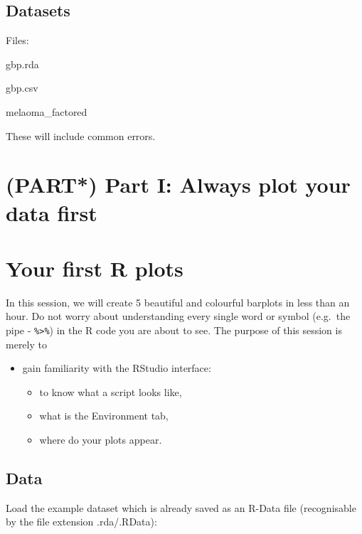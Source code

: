 \documentclass[]{book}
\makeatletter
\providecommand{\tightlist}{%
  \setlength{\itemsep}{0pt}\setlength{\parskip}{0pt}}
\newenvironment{kframe}{%
\medskip{}
\setlength{\fboxsep}{.8em}
 \def\at@end@of@kframe{}%
 \ifinner\ifhmode%
  \def\at@end@of@kframe{\end{minipage}}%
  \begin{minipage}{\columnwidth}%
 \fi\fi%
 \def\FrameCommand##1{\hskip\@totalleftmargin \hskip-\fboxsep
 \colorbox{shadecolor}{##1}\hskip-\fboxsep
     \hskip-\linewidth \hskip-\@totalleftmargin \hskip\columnwidth}%
 \MakeFramed {\advance\hsize-\width
   \@totalleftmargin\z@ \linewidth\hsize
   \@setminipage}}%
 {\par\unskip\endMakeFramed%
 \at@end@of@kframe}
\newenvironment{rmdblock}[1]
  {
  \begin{itemize}
  \renewcommand{\labelitemi}{
    \raisebox{-.7\height}[0pt][0pt]{
      {\setkeys{Gin}{width=3em,keepaspectratio}\texttt{[image: images/\#1]}}
    }
  }
  \setlength{\fboxsep}{1em}
  \begin{kframe}
  \item
  }
  {
  \end{kframe}
  \end{itemize}
  }
\newenvironment{healthyr}
  {\begin{rmdblock}{cover}}
  {\end{rmdblock}}
\newenvironment{error}
  {\begin{rmdblock}{error}}
  {\end{rmdblock}}
\makeatother
\begin{document}
\section{Datasets}\label{datasets}

\begin{healthyr}
Files:

gbp.rda

gbp.csv

melaoma\_factored
\end{healthyr}

\begin{error}
These will include common errors.
\end{error}

\chapter*{(PART*) Part I: Always plot your data
first}\label{part-part-i-always-plot-your-data-first}

\chapter{Your first R plots}\label{your-first-r-plots}

In this session, we will create 5 beautiful and colourful barplots in
less than an hour. Do not worry about understanding every single word or
symbol (e.g.~the pipe - \texttt{\%\textgreater{}\%}) in the R code you
are about to see. The purpose of this session is merely to

\begin{itemize}
\tightlist
\item
  gain familiarity with the RStudio interface:

  \begin{itemize}
  \tightlist
  \item
    to know what a script looks like,
  \item
    what is the Environment tab,
  \item
    where do your plots appear.
  \end{itemize}
\end{itemize}

\section{Data}\label{data}

Load the example dataset which is already saved as an R-Data file
(recognisable by the file extension .rda/.RData):
\end{document}
